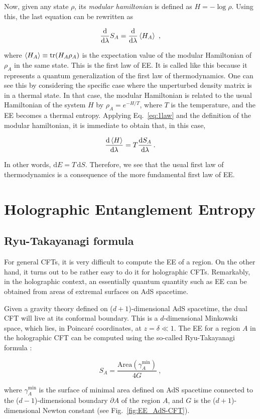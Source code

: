 \documentclass[twocolumn]{revtex4}
\providecommand{\eq}[2]{
    \begin{equation}
        #2
    \label{eq:#1}
    \end{equation}
}
\DeclareMathOperator{\tr}{tr}
\begin{document}
Now, given any state $\rho$, its \emph{modular hamiltonian} is defined as $H = - \log \rho$. %
Using this, the last equation can be rewritten  as
\eq{1law}{
    \frac{\mathrm{d}}{\mathrm{d} \lambda} S_A = \frac{\mathrm{d}}{\mathrm{d} \lambda} \braket{H_A} \ ,
}
where $\braket{H_A} \equiv \tr (H_A \rho_A)$ is the expectation value of the modular Hamiltonian of $\rho_A$ in the same state. This is the first law of EE. It is called like this because it represents a quantum generalization of the first law of thermodynamics. One can see this by considering the specific case where the unperturbed density matrix is in a  thermal state. In that case, the modular Hamiltonian is related to the usual Hamiltonian of the system $H$ by
$
    \rho_A =  e^{-H/T} 
$, where $T$ is the temperature,
and the EE becomes a thermal entropy. Applying Eq.~\ref{eq:1law} and the definition of the modular hamiltonian, it is immediate to obtain that, in this case,
\eq{1law_thermo}{
    \frac{\mathrm{d}\braket{H}}{\mathrm{d} \lambda}  =  T \frac{\mathrm{d}S_A}{\mathrm{d} \lambda}  \, .
}
In other words, $\mathrm{d} E = T \, \mathrm{d} S$. Therefore, we see that the usual first law of thermodynamics is a consequence of  the more fundamental first law of EE.


\section{Holographic Entanglement Entropy} \label{s:EE_Holo}


\subsection{Ryu-Takayanagi formula} \label{ss:R-T}

For general CFTs, it is very difficult to compute the EE of a region. On the other hand, it turns out to be rather easy to do it for holographic CFTs. Remarkably, in the holographic context, an essentially quantum quantity such as EE can be obtained from areas of extremal surfaces on AdS spacetime.

Given a gravity theory defined on ($d+1$)-dimensional AdS spacetime, the dual CFT will live at its conformal boundary. This is a $d$-dimensional Minkowski space, which lies, in Poincar\'e coordinates, at 
$z=\delta \ll 1$. The EE for a region $A$ in the holographic CFT can be computed using the so-called Ryu-Takayanagi formula \cite{ryu_holographic_2008}:
\eq{EE_RT}{
    S_A = \frac{ \text{Area}(\gamma_A^\text{min}) }{ 4 G } \ ,
}
where $\gamma_A^\text{min}$ is the surface of minimal area defined on AdS spacetime connected to the ($d-1$)-dimensional boundary $\partial A$ of the region $A$, and $G$ is the ($d+1$)-dimensional Newton constant (see Fig.~\ref{fig:EE_AdS-CFT}).
\end{document}
